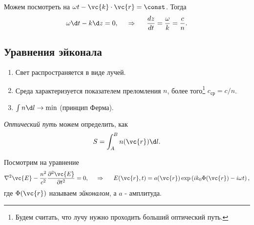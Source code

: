 Можем посмотреть на $\omega t - \vc{k} \cdot \vc{r} = \const$. Тогда
\begin{equation*}
    \omega \d t - k \d z = 0,
    \hspace{0.5cm} \Rightarrow \hspace{0.5cm}
    \frac{dz}{dt} = \frac{\omega}{k} = \frac{c}{n}.
\end{equation*}


\subsection{Уравнения эйконала}

\begin{enumerate}
    \item Свет распространяется в виде лучей.
    \item Среда характеризуется показателем преломления $n$, более того\footnote{
        Будем считать, что лучу нужно проходить больший оптический путь.
    }  $c_{\text{ср}} = c / n$.
    \item $\int n \d l \to \min$ (принцип Ферма).
\end{enumerate}

\begin{to_def}
    \textit{Оптический путь} можем определить, как
    \begin{equation*}
        S = \int_A^B n(\vc{r}) \d l.
    \end{equation*}
\end{to_def}


Посмотрим на уравнение
\begin{equation*}
    \nabla^2 \vc{E} - \frac{n^2}{c^2} \frac{\partial^2 \vc{E}}{\partial t^2} = 0,
    \hspace{0.5cm} \Rightarrow \hspace{0.5cm}
    {E} (\vc{r}, t) = a(\vc{r}) \exp\left(
        i k_0 \Phi(\vc{r}) - i \omega t
    \right),
\end{equation*}
где $\Phi(\vc{r})$ называем \textit{эйконалом}, а $a$ - амплитуда.


